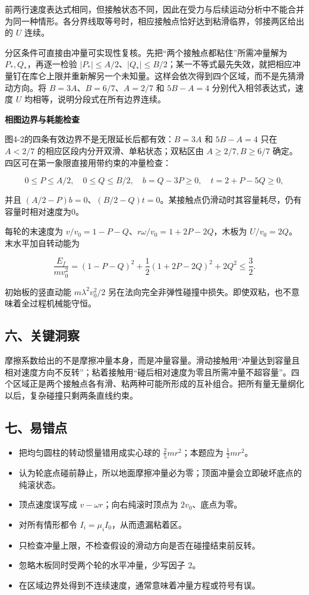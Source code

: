 \documentclass[12pt,a4paper,UTF8]{ctexart}
\newcommand{\tightlist}{\setlength{\itemsep}{0pt}\setlength{\parskip}{0pt}}
\begin{document}
前两行速度表达式相同，但接触状态不同，因此在受力与后续运动分析中不能合并为同一种情形。各分界线取等号时，相应接触点恰好达到粘滑临界，邻接两区给出的
\(U\) 连续。

分区条件可直接由冲量可实现性复核。先把``两个接触点都粘住''所需冲量解为
\(P_*,Q_*\)，再逐一检验
\(|P_*|\le A/2\)、\(|Q_*|\le B/2\)；某一不等式最先失效，就把相应冲量钉在库仑上限并重新解另一个未知量。这样会依次得到四个区域，而不是先猜滑动方向。将
\(B=3A\)、\(B=6/7\)、\(A=2/7\) 和 \(5B-A=4\) 分别代入相邻表达式，速度
\(U\) 均相等，说明分段式在所有边界连续。

\textbf{相图边界与耗能检查}

图4-2的四条有效边界不是无限延长后都有效：\(B=3A\) 和 \(5B-A=4\) 只在
\(A<2/7\) 的相应区段内分开双滑、单粘状态；双粘区由 \(A\ge2/7,B\ge6/7\)
确定。四区可在第一象限直接用带约束的冲量检查：

\[0\le P\le A/2,\quad0\le Q\le B/2,
\quad b=Q-3P\ge0,\quad t=2+P-5Q\ge0,\]

并且
\((A/2-P)b=0\)、\((B/2-Q)t=0\)。某接触点仍滑动时其容量耗尽，仍有容量时相对速度为0。

每轮的末速度为 \(v/v_0=1-P-Q\)、\(r\omega/v_0=1+2P-2Q\)，木板为
\(U/v_0=2Q\)。末水平加自转动能为

\[\frac{E_f}{mv_0^2}=(1-P-Q)^2
+\frac12(1+2P-2Q)^2+2Q^2\le\frac32.\]

初始板的竖直动能 \(m\lambda^2v_0^2/2\)
另在法向完全非弹性碰撞中损失。即使双粘，也不意味着全过程机械能守恒。

\subsection{六、关键洞察}\label{ux516dux5173ux952eux6d1eux5bdf-3}

摩擦系数给出的不是摩擦冲量本身，而是冲量容量。滑动接触用``冲量达到容量且相对速度方向不反转''；粘着接触用``碰后相对速度为零且所需冲量不超容量''。四个区域正是两个接触点各有滑、粘两种可能所形成的互补组合。把所有量无量纲化以后，复杂碰撞只剩两条直线约束。

\subsection{七、易错点}\label{ux4e03ux6613ux9519ux70b9-3}

\begin{itemize}
\tightlist
\item
  把均匀圆柱的转动惯量错用成实心球的 \(\frac25mr^2\)；本题应为
  \(\frac12mr^2\)。
\item
  认为轮底点碰前静止，所以地面摩擦冲量必为零；顶面冲量会立即破坏底点的纯滚状态。
\item
  顶点速度误写成 \(v-\omega r\)；向右纯滚时顶点为 \(2v_0\)、底点为零。
\item
  对所有情形都令 \(I_i=\mu_iI_0\)，从而遗漏粘着区。
\item
  只检查冲量上限，不检查假设的滑动方向是否在碰撞结束前反转。
\item
  忽略木板同时受两个轮的水平冲量，少写因子 \(2\)。
\item
  在区域边界处得到不连续速度，通常意味着冲量方程或符号有误。
\end{itemize}
\end{document}
